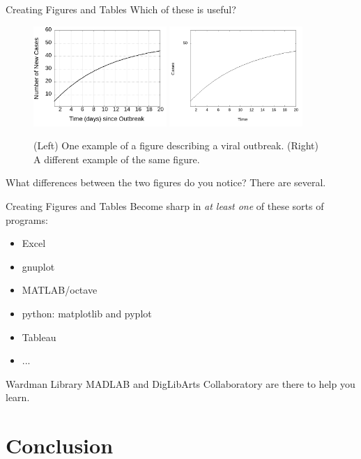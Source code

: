 \documentclass{beamer}
\begin{document}
\begin{frame}{Creating Figures and Tables}
Which of these is useful?
\begin{figure}
\includegraphics[width=0.45\textwidth]{figures/outbreak.png}
\includegraphics[width=0.45\textwidth]{figures/outbreak2.png}
\caption{\label{fig:outbreak} (Left) One example of a figure describing a viral outbreak. (Right) A different example of the same figure.}
\end{figure}
What differences between the two figures do you notice?  There are several.
\end{frame}

\begin{frame}{Creating Figures and Tables}
Become sharp in \textit{at least one} of these sorts of programs:
\begin{itemize}
\item Excel
\item gnuplot
\item MATLAB/octave
\item python: matplotlib and pyplot
\item Tableau
\item ...
\end{itemize}
\alert{Wardman Library MADLAB and DigLibArts Collaboratory} are there to help you learn.
\end{frame}

\section{Conclusion}
\end{document}

